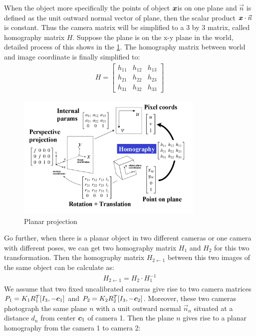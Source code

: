 When the object more specifically the points of object $\boldsymbol{x}$is on one plane and $\vec{n}$ is defined as the unit outward normal vector of plane, then the scalar product $\boldsymbol{x} \cdot \vec{n}$ is constant. Thus the camera matrix will be simplified to a 3 by 3 matrix, called homography matrix $H$. Suppose the plane is on the x-y plane in the world, detailed process of this shows in the \cref{fig:planar projection}. The homography matrix between world and image coordinate is finally simplified to:
\begin{align}
H = \begin{bmatrix}
h_{11} &h_{12} & h_{13}\\
h_{21} &h_{22} &h_{23}\\
h_{31}&h_{32}&h_{33}
\end{bmatrix}
\end{align}
\begin{figure}[htbp]
	\centering
	\includegraphics[width=0.80\textwidth]{./images/Planar Projection.png}
	\caption{Planar projection \cite{collinsPlanarHomographies}}
	\label{fig:planar projection}
\end{figure}
Go further, when there is a planar object in two different cameras or one camera with different poses, we can get two homography matrix $ H_{1}$ and $H_{2}$ for this two transformation. Then the homography matrix $H_{2\leftarrow1}$ between this two images of the same object can be calculate as:
\begin{align} 
H_{2\leftarrow1} = H_{2}\cdot H_{1}^{-1}
\end{align}
We assume that two fixed uncalibrated cameras give rise to two camera matrices $P_{1} = K_1R_1^T[I_3, -\boldsymbol{c}_{1}]$ and $P_{2} = K_{2}R_{2}^T[I_{3}, -\boldsymbol{c}_{2}]$. Moreover, these two cameras photograph the same plane $n$ with a unit outward normal $\vec{n}_{n}$ situated at a distance $d_{n}$ from center $\boldsymbol{c}_{1}$ of camera 1. Then the plane $n$ gives rise to a planar homography from the camera 1 to camera 2: \cite{chojnackiEnforcingConsistencyConstraints2015} \cite{bakerParameterizingHomographies}

